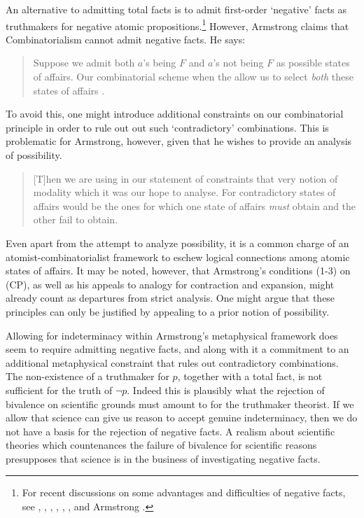 An alternative to admitting total facts is to admit first-order `negative' facts as truthmakers for negative atomic propositions.\footnote{For recent discussions on some advantages and difficulties of negative facts, see \cite{Molnar:2000}, \cite{Priest:2000}, \cite{Beall:2000}, \cite{Simons:2005}, \cite{Mumford:2005}, \cite{Cheyne:2006}, \cite{Parsons:2006} and Armstrong \citeyear{Armstrong:2000,Armstrong:2005,Armstrong:2006}. } However, Armstrong claims that Combinatorialism cannot admit negative facts. He says:

\begin{quote}
	Suppose we admit both $a$'s being $F$ and $a$'s not being $F$ as possible states of affairs. Our combinatorial scheme when the allow us to select \emph{both} these states of affairs \citeyear[p. 48]{Armstrong:89}.
\end{quote}

\noindent To avoid this, one might introduce additional constraints on our combinatorial principle in order to rule out out such `contradictory' combinations. This is problematic for Armstrong, however, given that he wishes to provide an analysis of possibility.

\begin{quote}
	[T]hen we are using in our statement of constraints that very notion of modality which it was our hope to analyse. For contradictory states of affairs would be the ones for which one state of affairs \emph{must} obtain and the other fail to obtain.
\end{quote}

\noindent Even apart from the attempt to analyze possibility, it is a common charge of an atomist-combinatorialist framework to eschew logical connections among atomic states of affairs. It may be noted, however, that Armstrong's conditions (1-3) on (CP), as well as his appeals to analogy for contraction and expansion, might already count as departures from strict analysis. One might argue that these principles can only be justified by appealing to a prior notion of possibility. 

Allowing for indeterminacy within Armstrong's metaphysical framework does seem to require admitting negative facts, and along with it a commitment to an additional metaphysical constraint that rules out contradictory combinations. The non-existence of a truthmaker for $p$, together with a total fact, is not sufficient for the truth of $\neg p$. Indeed this is plausibly what the rejection of bivalence on scientific grounds must amount to for the truthmaker theorist. If we allow that science can give us reason to accept genuine indeterminacy, then we do not have a basis for the rejection of negative facts. A realism about scientific theories which countenances the failure of bivalence for scientific reasons presupposes that science is in the business of investigating negative facts.

